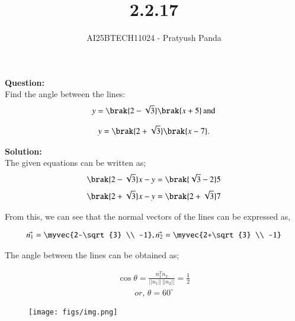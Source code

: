 \documentclass[journal]{IEEEtran}
\begin{document}

\vspace{3cm}

\title{2.2.17}
\author{AI25BTECH11024 - Pratyush Panda
}
\maketitle
{\let\newpage\relax\maketitle}

\renewcommand{\thefigure}{\theenumi}
\renewcommand{\thetable}{\theenumi}
\setlength{\intextsep}{10pt} %


\renewcommand{\thetable}{\theenumi}

\textbf{Question: } \\
Find the angle between the lines: \\
\begin{align}
y=\brak{2-\sqrt{3}}\brak{x+5} \, \text{and}
\end{align}

\begin{align}
y=\brak{2+\sqrt{3}}\brak{x-7}.
\end{align}

\textbf{Solution: } \\
The given equations can be written as;
\begin{align}
\brak{2-\sqrt{3}}x - y = \brak{\sqrt{3}-2}5
\end{align}
\begin{align}
\brak{2+\sqrt{3}}x - y = \brak{2+\sqrt{3}}7
\end{align}

From this, we can see that the normal vectors of the lines can  be expressed as,

\begin{align}
\Vec{n_1}=\myvec{2-\sqrt{3} \\ -1}, \Vec{n_2}=\myvec{2+\sqrt{3} \\ -1}
\end{align}


The angle between the lines can be obtained as;

\begin{align}
\cos{\theta}=\frac{n_1^Tn_2}{||n_1||\,||n_2||}=\frac{1}{2}
\end{align}
\begin{align}
or, \, \theta=60^\circ
\end{align}

\begin{figure}[H]
\centering
\texttt{[image: figs/img.png]}
\caption*{}
\end{figure}
\end{document}
